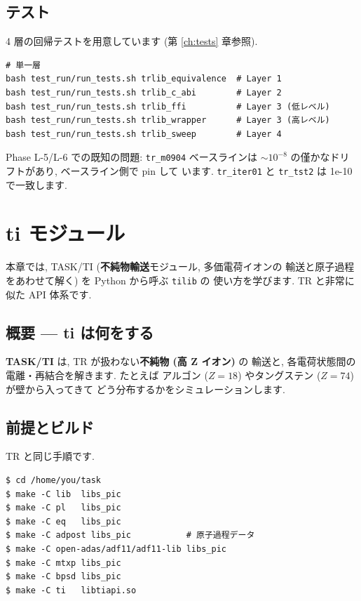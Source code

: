 \documentclass[11pt,a4paper]{report}
\begin{document}
\section{テスト}

4 層の回帰テストを用意しています (第 \ref{ch:tests} 章参照).

\begin{lstlisting}[style=bash]
# 単一層
bash test_run/run_tests.sh trlib_equivalence  # Layer 1
bash test_run/run_tests.sh trlib_c_abi        # Layer 2
bash test_run/run_tests.sh trlib_ffi          # Layer 3 (低レベル)
bash test_run/run_tests.sh trlib_wrapper      # Layer 3 (高レベル)
bash test_run/run_tests.sh trlib_sweep        # Layer 4
\end{lstlisting}

Phase L-5/L-6 での既知の問題: \texttt{tr\_m0904} ベースラインは
\(\sim 10^{-8}\) の僅かなドリフトがあり, ベースライン側で pin して
います. \texttt{tr\_iter01} と \texttt{tr\_tst2} は 1e-10 で一致します.

\clearpage
\chapter{ti モジュール}
\label{ch:ti}

\begin{learn}
本章では, TASK/TI (\textbf{不純物輸送}モジュール, 多価電荷イオンの
輸送と原子過程をあわせて解く) を Python から呼ぶ \texttt{tilib} の
使い方を学びます. TR と非常に似た API 体系です.
\end{learn}

\section{概要 — ti は何をする}

\textbf{TASK/TI} は, TR が扱わない\textbf{不純物 (高 Z イオン)} の
輸送と, 各電荷状態間の電離・再結合を解きます. たとえば
アルゴン (\(Z=18\)) やタングステン (\(Z=74\)) が壁から入ってきて
どう分布するかをシミュレーションします.

\section{前提とビルド}

TR と同じ手順です.

\begin{lstlisting}[style=bash]
$ cd /home/you/task
$ make -C lib  libs_pic
$ make -C pl   libs_pic
$ make -C eq   libs_pic
$ make -C adpost libs_pic           # 原子過程データ
$ make -C open-adas/adf11/adf11-lib libs_pic
$ make -C mtxp libs_pic
$ make -C bpsd libs_pic
$ make -C ti   libtiapi.so
\end{lstlisting}
\end{document}
